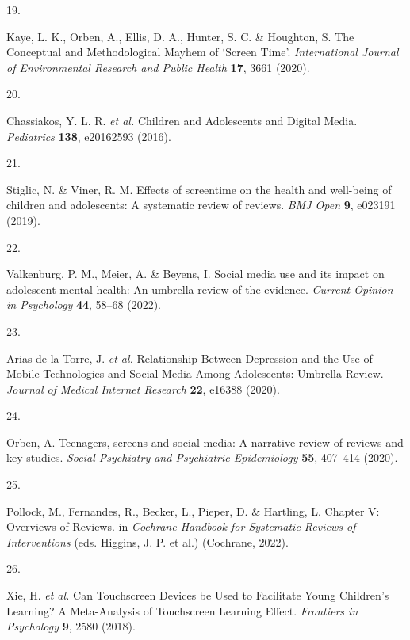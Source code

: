 \documentclass[
  english,
  man]{apa6}
\newlength{\cslhangindent}
\newlength{\csllabelwidth}
\newenvironment{CSLReferences}[2] %
 {%
  \setlength{\parindent}{0pt}
  \ifodd #1 \everypar{\setlength{\hangindent}{\cslhangindent}}\ignorespaces\fi
  \ifnum #2 > 0
  \setlength{\parskip}{#2\baselineskip}
  \fi
 }%
 {}
\newcommand{\CSLLeftMargin}[1]{\parbox[t]{\csllabelwidth}{#1}}
\newcommand{\CSLRightInline}[1]{\parbox[t]{\linewidth - \csllabelwidth}{#1}\break}
\begin{document}
\begin{CSLReferences}{0}{0}
\leavevmode{}%
\CSLLeftMargin{19. }
\CSLRightInline{Kaye, L. K., Orben, A., Ellis, D. A., Hunter, S. C. \& Houghton, S. The {Conceptual} and {Methodological Mayhem} of {`{Screen Time}'}. \emph{International Journal of Environmental Research and Public Health} \textbf{17}, 3661 (2020).}

\leavevmode{}%
\CSLLeftMargin{20. }
\CSLRightInline{Chassiakos, Y. L. R. \emph{et al.} Children and {Adolescents} and {Digital Media}. \emph{Pediatrics} \textbf{138}, e20162593 (2016).}

\leavevmode{}%
\CSLLeftMargin{21. }
\CSLRightInline{Stiglic, N. \& Viner, R. M. Effects of screentime on the health and well-being of children and adolescents: A systematic review of reviews. \emph{BMJ Open} \textbf{9}, e023191 (2019).}

\leavevmode{}%
\CSLLeftMargin{22. }
\CSLRightInline{Valkenburg, P. M., Meier, A. \& Beyens, I. Social media use and its impact on adolescent mental health: {An} umbrella review of the evidence. \emph{Current Opinion in Psychology} \textbf{44}, 58--68 (2022).}

\leavevmode{}%
\CSLLeftMargin{23. }
\CSLRightInline{Arias-de la Torre, J. \emph{et al.} Relationship {Between Depression} and the {Use} of {Mobile Technologies} and {Social Media Among Adolescents}: {Umbrella Review}. \emph{Journal of Medical Internet Research} \textbf{22}, e16388 (2020).}

\leavevmode{}%
\CSLLeftMargin{24. }
\CSLRightInline{Orben, A. Teenagers, screens and social media: A narrative review of reviews and key studies. \emph{Social Psychiatry and Psychiatric Epidemiology} \textbf{55}, 407--414 (2020).}

\leavevmode{}%
\CSLLeftMargin{25. }
\CSLRightInline{Pollock, M., Fernandes, R., Becker, L., Pieper, D. \& Hartling, L. Chapter {V}: {Overviews} of {Reviews}. in \emph{Cochrane {Handbook} for {Systematic Reviews} of {Interventions}} (eds. Higgins, J. P. et al.) ({Cochrane}, 2022).}

\leavevmode{}%
\CSLLeftMargin{26. }
\CSLRightInline{Xie, H. \emph{et al.} Can {Touchscreen Devices} be {Used} to {Facilitate Young Children}'s {Learning}? {A Meta-Analysis} of {Touchscreen Learning Effect}. \emph{Frontiers in Psychology} \textbf{9}, 2580 (2018).}


\end{CSLReferences}
\end{document}

